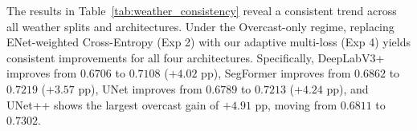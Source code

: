 \documentclass[journal,compsoc]{IEEEtran}
\begin{document}
\begin{table}[t]
\centering
\caption{Consistency of the Proposed Adaptive Loss Across Weather Regimes (Test mIoU).}
\label{tab:weather_consistency}
\small
{}
\end{table}

The results in Table~\ref{tab:weather_consistency} reveal a consistent trend across all weather splits and architectures. Under the Overcast-only regime, replacing ENet-weighted Cross-Entropy (Exp 2) with our adaptive multi-loss (Exp 4) yields consistent improvements for all four architectures. Specifically, DeepLabV3+ improves from $0.6706$ to $0.7108$ ($+4.02$ pp), SegFormer improves from $0.6862$ to $0.7219$ ($+3.57$ pp), UNet improves from $0.6789$ to $0.7213$ ($+4.24$ pp), and UNet++ shows the largest overcast gain of $+4.91$ pp, moving from $0.6811$ to $0.7302$. 
\end{document}
